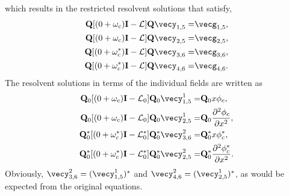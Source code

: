  which results in the restricted resolvent solutions that satisfy,
 \begin{subequations}
 	\label{eqn:GL_resolvents}
	 \begin{align}
	 	\mathbf{Q}[(0 + \omega_{c})\mathbf{I} - \mathcal{L}]\mathbf{Q}\vecy_{1,5} =& \vecg_{1,5}, \\
	 	\mathbf{Q}[(0 + \omega_{c})\mathbf{I} - \mathcal{L}]\mathbf{Q}\vecy_{2,5} =& \vecg_{2,5}, \\
	 	\mathbf{Q}[(0 + \omega^{*}_{c})\mathbf{I} - \mathcal{L}]\mathbf{Q}\vecy_{3,6} =& \vecg_{3,6}, \\
	 	\mathbf{Q}[(0 + \omega^{*}_{c})\mathbf{I} - \mathcal{L}]\mathbf{Q}\vecy_{4,6} =& \vecg_{4,6}. 
	 \end{align}
\end{subequations}
The resolvent solutions in terms of the individual fields are written as
 \begin{subequations}
 	\label{eqn:GL_sub_resolvents}
	 \begin{align}
	 	\mathbf{Q}_{0}[(0 + \omega_{c})\mathbf{I} - \mathcal{L}_{0}]\mathbf{Q}_{0}\vecy^{1}_{1,5} =& \mathbf{Q}_{0}x\phi_{c}, \\
	 	\mathbf{Q}_{0}[(0 + \omega_{c})\mathbf{I} - \mathcal{L}_{0}]\mathbf{Q}_{0}\vecy^{1}_{2,5} =& \mathbf{Q}_{0}\dfrac{\partial^{2}\phi_{c}}{\partial x^{2}}, \\
	 	\mathbf{Q}^{*}_{0}[(0 + \omega^{*}_{c})\mathbf{I} - \mathcal{L}^{*}_{0}]\mathbf{Q}^{*}_{0}\vecy^{2}_{3,6} =& \mathbf{Q}^{*}_{0}x\phi^{*}_{c}, \\
		\mathbf{Q}^{*}_{0}[(0 + \omega^{*}_{c})\mathbf{I} - \mathcal{L}^{*}_{0}]\mathbf{Q}^{*}_{0}\vecy^{2}_{2,5} =& \mathbf{Q}^{*}_{0}\dfrac{\partial^{2}\phi^{*}_{c}}{\partial x^{2}}.
	 \end{align}
\end{subequations}
 Obviously, $\vecy^{2}_{3,6} = (\vecy^{1}_{1,5})^{*}$ and $\vecy^{2}_{4,6} = (\vecy^{1}_{2,5})^{*}$, as would be expected from the original equations. 
 


